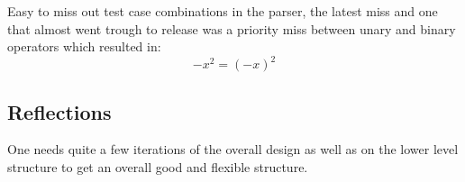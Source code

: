 \documentclass[a4paper,11pt]{kth-mag}
\begin{document}
        Easy to miss out test case combinations in the parser, the latest miss
        and one that almost went trough to release was a priority miss between
        unary and binary operators which resulted in:
        \begin{equation*}
            -x^2=(-x)^2
        \end{equation*}

    \subsection{Reflections}
        One needs quite a few iterations of the overall design as well
        as on the lower level structure to get an overall good and flexible structure.
\end{document}

